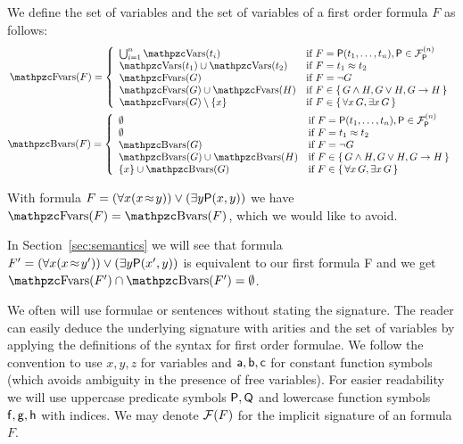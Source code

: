 \begin{definition}\label{def:fof:fvars}\label{def:fof:bvars}
	We define the set of  variables and the set of  variables
	of a first order formula \( F \) as follows:
\begin{gather*}
	\MDEFINE{\fvar(F)}{ll}{
		\bigcup_{i=1}^n \var(t_i)
		&\text{if }F
		= \mP(t_1,\ldots,t_n), \mP\in\mcFPn
		\\
		\var(t_1)\cup\var(t_2)
		&\text{if }F
		= t_1\mEQ t_2
		\\
		\fvar(G)&\text{if }F = \lnot G
		\\
		\fvar(G) \cup \fvar(H)&\text{if }F \in \{ \, G\land H,G \lor H,G\limp H \, \}
		\\
		\fvar (G) \setminus \{ x\} &\text{if } F \in \{ \, \forall x \, G, \exists x \, G \, \}
	}
	\\
\MDEFINE{\bvar(F)}{ll}{
	\emptyset &\text{if }F = \mP(t_1,\ldots,t_n), \mP\in\mcFPn
	\\
	\emptyset &\text{if }F = t_1\mEQ t_2
	\\
	\bvar(G)&\text{if }F = \lnot G
	\\
	\bvar(G) \cup \bvar(H)&\text{if }F \in \{ \, G \land H, G \lor H, G \limp H \, \}
	\\
	\{ x\} \cup \bvar (G) &\text{if } F \in \{ \, \forall x \, G, \exists x\,G \, \}
}
\end{gather*}
\end{definition}

\begin{example}
	With formula \( F = (\forall x (x\!\approx\!y)) \lor (\exists y \mathsf{P}(x,y)) \)
	we have \( \fvar(F) = \bvar(F) \), which we would like to avoid.

	In Section~\vref{sec:semantics} we will see that formula
	\( F' = (\forall x (x\!\approx\!y')) \lor (\exists y \mathsf{P}(x',y)) \)
	is equivalent to our first formula F
	and we get
	\( \fvar(F') \cap \bvar(F') = \emptyset \).
\end{example}
We often will use formulae or sentences
without stating the signature.
The reader can easily deduce the underlying  signature with arities
and the set of variables by applying the definitions of the syntax for first order formulae.
We follow the convention to use \( x,y,z \) for variables
and \( \mathsf{a},\mathsf{b},\mathsf{c} \) for constant function symbols
(which avoids ambiguity in the presence of free variables).
For easier readability we will use
uppercase predicate symbols \(\mathsf{P},\mathsf{Q} \) and
lowercase function symbols \( \mathsf{f},\mathsf{g},\mathsf{h} \) with indices.
We may denote \( \mathcal{F}(F) \) for the implicit signature of an formula \( F \).


